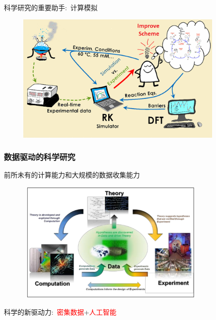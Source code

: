 \begin{frame}{科学研究的重要助手:~计算模拟}
\begin{figure}[h!]
\vspace*{-0.18in}
\centering
\includegraphics[height=2.55in,width=4.05in]{Figures/Schematic_Material-Design.png}
\label{Schematic_Material-Design}
\end{figure}
\end{frame}

\frame
{
	\frametitle{数据驱动的科学研究}
前所未有的计算能力和大规模的数据收集能力%
\begin{figure}[h!]
\centering
\includegraphics[height=2.40in,width=3.75in]{Figures/Four_Model_1.png}
\label{Four_Model_1}
\end{figure}
科学的新驱动力:~\textcolor{red}{密集数据}+\textcolor{red}{人工智能}\\
}

